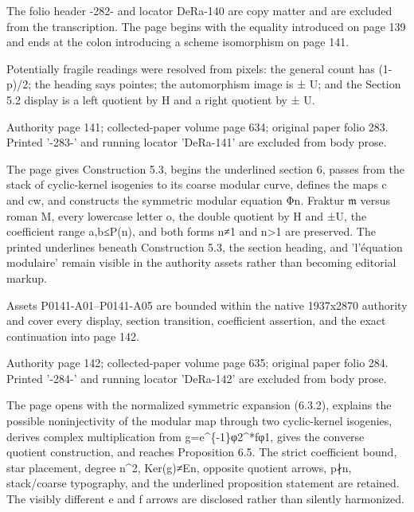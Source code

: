\documentclass[11pt,a4paper]{article}
\begin{document}
The folio header -282- and locator DeRa-140 are copy matter and are excluded from the transcription. The page begins with the equality introduced on page 139 and ends at the colon introducing a scheme isomorphism on page 141.

Potentially fragile readings were resolved from pixels: the general count has (1-p)/2; the heading says pointes; the automorphism image is ± U; and the Section 5.2 display is a left quotient by H and a right quotient by ± U.


\par\medskip
\hypertarget{D018-P0141}{}
\par\smallskip
Authority page 141; collected-paper volume page 634; original paper folio 283. Printed '-283-' and running locator 'DeRa-141' are excluded from body prose.

The page gives Construction 5.3, begins the underlined section 6, passes from the stack of cyclic-kernel isogenies to its coarse modular curve, defines the maps c and cw, and constructs the symmetric modular equation Φ\textunderscore{}n. Fraktur \ensuremath{\mathfrak{m}} versus roman M, every lowercase letter o, the double quotient by H and ±U, the coefficient range a,b≤P(n), and both forms n≠1 and n>1 are preserved. The printed underlines beneath Construction 5.3, the section heading, and 'l'équation modulaire' remain visible in the authority assets rather than becoming editorial markup.

Assets P0141-A01--P0141-A05 are bounded within the native 1937x2870 authority and cover every display, section transition, coefficient assertion, and the exact continuation into page 142.


\par\medskip
\hypertarget{D018-P0142}{}
\par\smallskip
Authority page 142; collected-paper volume page 635; original paper folio 284. Printed '-284-' and running locator 'DeRa-142' are excluded from body prose.

The page opens with the normalized symmetric expansion (6.3.2), explains the possible noninjectivity of the modular map through two cyclic-kernel isogenies, derives complex multiplication from g=e\textasciicircum{}\{-1\}φ\textunderscore{}2\textasciicircum{}*fφ\textunderscore{}1, gives the converse quotient construction, and reaches Proposition 6.5. The strict coefficient bound, star placement, degree n\textasciicircum{}2, Ker(g)≠E\textunderscore{}n, opposite quotient arrows, p∤n, stack/coarse typography, and the underlined proposition statement are retained. The visibly different e and f arrows are disclosed rather than silently harmonized.
\end{document}
